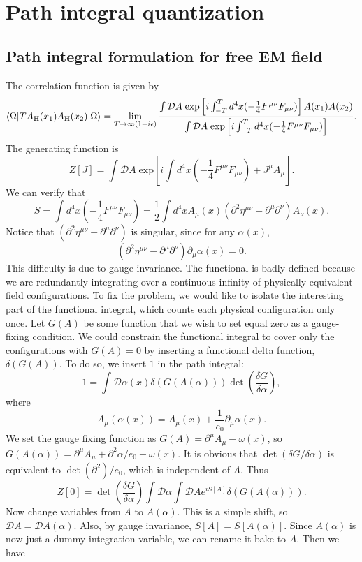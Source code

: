 \section{Path integral quantization}
\subsection{Path integral formulation for free EM field}
The correlation function is given by
\[\langle \Omega | T A_{\rm H}(x_1) A_{\rm H}(x_2)| \Omega \rangle = \lim_{T \to \infty(1-i\epsilon)} \frac{\int \mathcal{D}A \; \mathrm{exp} \left[ i\int_{-T}^T d^4x (-\frac{1}{4} F^{\mu\nu}F_{\mu\nu}) \right] A(x_1) A(x_2)}{\int \mathcal{D}A \; \mathrm{exp} \left[ i\int_{-T}^T d^4x (-\frac{1}{4} F^{\mu\nu}F_{\mu\nu}) \right]}.\]
The generating function is 
\[Z[J] = \int \mathcal{D}A \; \mathrm{exp} \left[ i\int d^4x (-\frac{1}{4} F^{\mu\nu}F_{\mu\nu}) + J^{\mu} A_{\mu} \right].\]
We can verify that
\[S = \int d^4x (-\frac{1}{4} F^{\mu\nu}F_{\mu\nu}) = \frac{1}{2} \int d^4x A_{\mu}(x) (\partial^2\eta^{\mu\nu} - \partial^{\mu}\partial^{\nu})A_{\nu}(x).\]
Notice that $(\partial^2\eta^{\mu\nu} - \partial^{\mu}\partial^{\nu})$ is singular, since for any $\alpha(x)$, 
\[(\partial^2\eta^{\mu\nu} - \partial^{\mu}\partial^{\nu})\partial_{\mu}\alpha(x) = 0.\]
This difficulty is due to gauge invariance. 
The functional is badly defined because we are redundantly integrating over a continuous infinity of physically equivalent field configurations. To fix the problem, we would like to isolate the interesting part of the functional integral, which counts each physical configuration only once.
Let $G(A)$ be some function that we wish to set equal zero as a gauge-fixing condition. We could constrain the functional integral to cover only the configurations with $G(A) = 0$ by inserting a functional delta function, $\delta(G(A))$. To do so, we insert $1$ in the path integral:
\[ 1 = \int \mathcal{D}\alpha(x) \delta(G(A(\alpha))) \det \left( \frac{\delta G}{\delta \alpha} \right),\]
where
\[A_{\mu}(\alpha(x)) = A_{\mu}(x) + \frac{1}{e_0}\partial_{\mu}\alpha(x).\]
We set the gauge fixing function as $G(A) = \partial^{\mu} A_{\mu} -\omega(x)$, so $G(A(\alpha)) = \partial^{\mu} A_{\mu} + \partial^2 \alpha/e_0 - \omega(x)$. It is obvious that $\det \left( {\delta G}/{\delta \alpha} \right)$ is equivalent to $\det(\partial^2)/e_0$, which is independent of $A$. Thus
\[Z[0] = \det \left( \frac{\delta G}{\delta \alpha} \right) \int \mathcal{D}\alpha \int \mathcal{D}A e^{iS[A]} \delta(G(A(\alpha))).\]
Now change variables from $A$ to $A(\alpha)$. This is a simple shift, so $\mathcal{D}A = \mathcal{D}A(\alpha)$. Also, by gauge invariance, $S[A] = S[A(\alpha)]$. Since $A(\alpha)$ is now just a dummy integration variable, we can rename it bake to $A$. Then we have
